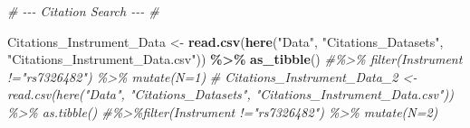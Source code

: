 \documentclass[
]{article}
\newenvironment{Shaded}{\begin{snugshade}}{\end{snugshade}}
\newcommand{\CommentTok}[1]{\textcolor[rgb]{0.56,0.35,0.01}{\textit{#1}}}
\newcommand{\FunctionTok}[1]{\textcolor[rgb]{0.13,0.29,0.53}{\textbf{#1}}}
\newcommand{\NormalTok}[1]{#1}
\newcommand{\OtherTok}[1]{\textcolor[rgb]{0.56,0.35,0.01}{#1}}
\newcommand{\SpecialCharTok}[1]{\textcolor[rgb]{0.81,0.36,0.00}{\textbf{#1}}}
\newcommand{\StringTok}[1]{\textcolor[rgb]{0.31,0.60,0.02}{#1}}
\begin{document}
\begin{Shaded}
\begin{Highlighting}[]
\CommentTok{\# {-}{-}{-} Citation Search {-}{-}{-} \# }

\NormalTok{Citations\_Instrument\_Data }\OtherTok{\textless{}{-}} \FunctionTok{read.csv}\NormalTok{(}\FunctionTok{here}\NormalTok{(}\StringTok{"Data"}\NormalTok{, }\StringTok{"Citations\_Datasets"}\NormalTok{, }\StringTok{"Citations\_Instrument\_Data.csv"}\NormalTok{)) }\SpecialCharTok{\%\textgreater{}\%} \FunctionTok{as\_tibble}\NormalTok{() }\CommentTok{\#\%\textgreater{}\% filter(Instrument !="rs7326482") \%\textgreater{}\% mutate(N=1)}
\CommentTok{\# Citations\_Instrument\_Data\_2 \textless{}{-} read.csv(here("Data", "Citations\_Datasets", "Citations\_Instrument\_Data.csv")) \%\textgreater{}\% as.tibble() \#\%\textgreater{}\%filter(Instrument !="rs7326482") \%\textgreater{}\%  mutate(N=2)}
\end{Highlighting}
\end{Shaded}
\end{document}
